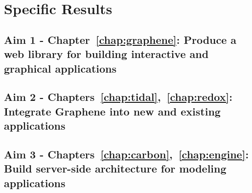 \section{Specific Results}
\subsection{Aim 1 - Chapter~\ref{chap:graphene}: Produce a web library for building interactive and graphical applications}
\subsection{Aim 2 - Chapters~\ref{chap:tidal},~\ref{chap:redox}: Integrate Graphene into new and existing applications}
\subsection{Aim 3 - Chapters~\ref{chap:carbon},~\ref{chap:engine}: Build server-side architecture for modeling applications}


